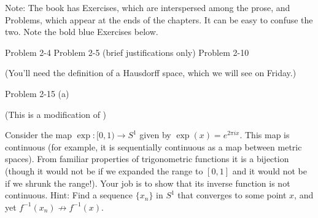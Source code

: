 \documentclass[minion]{homework651}
\begin{document}
Note: The book has Exercises, which are interspersed among the
prose, and Problems, which appear at the ends of the chapters.
It can be easy to confuse the two.  Note the bold blue Exercises
below.

\begin{problems}

\problem {}
\problem {}
\problem Problem 2-4
\problem Problem 2-5 (brief justifications only)
\problem Problem 2-10 

(You'll need the definition of a Hausdorff space, which we will see on Friday.)

\problem Problem 2-15 (a)

\problem (This is a modification of )

Consider the map $\exp:[0,1)\rightarrow S^1$ given by $\exp(x) = e^{2\pi i x}$.
This map is continuous (for example, it is sequentially continuous as 
a map between metric spaces).  From familiar properties of trigonometric
functions it is a bijection (though it would not be if we expanded the range to $[0,1]$
and it would not be if we shrunk the range!).  
Your job is to show that its inverse function is
not continuous.  Hint:  Find a sequence $\{x_n\}$ in $S^1$ that converges to some point $x$,
and yet $f^{-1}(x_n)\not\rightarrow f^{-1}(x)$.

\end{problems}
\end{document}
